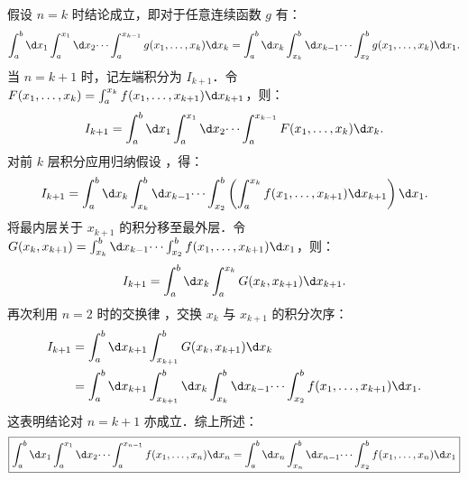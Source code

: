 \begin{myproof}
    假设 $n=k$ 时结论成立，即对于任意连续函数 $g$ 有：
    \begin{equation}
        \int_a^b \d x_1 \int_a^{x_1} \d x_2 \dots \int_a^{x_{k-1}} g(x_1, \dots, x_k) \d x_k = \int_a^b \d x_k \int_{x_k}^b \d x_{k-1} \dots \int_{x_2}^b g(x_1, \dots, x_k) \d x_1. \label{eq:induction-hypo}
    \end{equation}
    当 $n=k+1$ 时，记左端积分为 $I_{k+1}$．令 $F(x_1, \dots, x_k) = \int_a^{x_k} f(x_1, \dots, x_{k+1}) \d x_{k+1}$，则：
    \begin{equation}
        I_{k+1} = \int_a^b \d x_1 \int_a^{x_1} \d x_2 \dots \int_a^{x_{k-1}} F(x_1, \dots, x_k) \d x_k.
    \end{equation}
    对前 $k$ 层积分应用归纳假设 ，得：
    \begin{equation}
        I_{k+1} = \int_a^b \d x_k \int_{x_k}^b \d x_{k-1} \dots \int_{x_2}^b \left( \int_a^{x_k} f(x_1, \dots, x_{k+1}) \d x_{k+1} \right) \d x_1.
    \end{equation}
    将最内层关于 $x_{k+1}$ 的积分移至最外层．令 $G(x_k, x_{k+1}) = \int_{x_k}^b \d x_{k-1} \dots \int_{x_2}^b f(x_1, \dots, x_{k+1}) \d x_1$，则：
    \begin{equation}
        I_{k+1} = \int_a^b \d x_k \int_a^{x_k} G(x_k, x_{k+1}) \d x_{k+1}.
    \end{equation}
    再次利用 $n=2$ 时的交换律 ，交换 $x_k$ 与 $x_{k+1}$ 的积分次序：
    \begin{equation}
        \begin{aligned}
            I_{k+1} & = \int_a^b \d x_{k+1} \int_{x_{k+1}}^b G(x_k, x_{k+1}) \d x_k                                                           \\
                    & = \int_a^b \d x_{k+1} \int_{x_{k+1}}^b \d x_k \int_{x_k}^b \d x_{k-1} \dots \int_{x_2}^b f(x_1, \dots, x_{k+1}) \d x_1.
        \end{aligned}
    \end{equation}
    这表明结论对 $n=k+1$ 亦成立．综上所述：
    \begin{equation}
        \boxed{\int_a^b \d x_1 \int_a^{x_1} \d x_2 \dots \int_a^{x_{n-1}} f(x_1, \dots, x_n) \d x_n = \int_a^b \d x_n \int_{x_n}^b \d x_{n-1} \dots \int_{x_2}^b f(x_1, \dots, x_n) \d x_1}
    \end{equation}
\end{myproof}

\endinput
